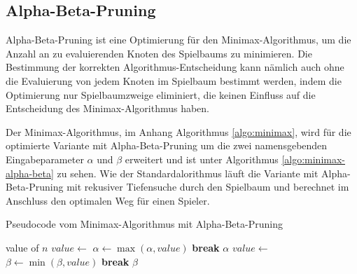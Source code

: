 \subsection{Alpha-Beta-Pruning}

Alpha-Beta-Pruning ist eine Optimierung für den Minimax-Algorithmus, um die Anzahl an zu evaluierenden Knoten des Spielbaums zu minimieren. Die Bestimmung der korrekten Algorithmus-Entscheidung kann nämlich auch ohne die Evaluierung von jedem Knoten im Spielbaum bestimmt werden, indem die Optimierung nur Spielbaumzweige eliminiert, die keinen Einfluss auf die Entscheidung des Minimax-Algorithmus haben. \cite{AlgorithmsAlphaBetaPruning}

Der Minimax-Algorithmus, im Anhang Algorithmus \ref{algo:minimax}, wird für die optimierte Variante mit Alpha-Beta-Pruning um die zwei namensgebenden Eingabeparameter $\alpha$ und $\beta$ erweitert und ist unter Algorithmus \ref{algo:minimax-alpha-beta} zu sehen. Wie der Standardalorithmus läuft die Variante mit Alpha-Beta-Pruning mit rekusiver Tiefensuche durch den Spielbaum und berechnet im Anschluss den optimalen Weg für einen Spieler.


\begin{algorithm}
    \caption{Pseudocode vom Minimax-Algorithmus mit Alpha-Beta-Pruning}
    \label{algo:minimax-alpha-beta}
    \begin{algorithmic}[1]
        \State \Return value of $n$
        \State $value \gets$ 
        \State $\alpha \gets \max(\alpha, value)$
        \If{$\alpha \geq \beta$}
        \State \textbf{break} 
        \EndIf
        \EndFor
        \State \Return $\alpha$
        \State $value \gets$ 
        \State $\beta \gets \min(\beta, value)$
        \If{$\beta \leq \alpha$}
        \State \textbf{break} 
        \EndIf
        \EndFor
        \State \Return $\beta$
        \EndIf
        \EndFunction
    \end{algorithmic}
\end{algorithm}

